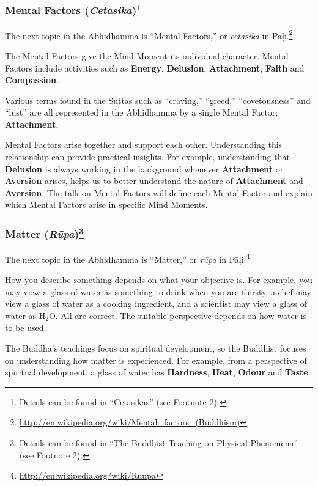 \subsubsection*{Mental Factors (\textit{Cetasika})\footnote{Details can be found in “Cetasikas” (see Footnote 2).}}

The next topic in the Abhidhamma is “Mental Factors,” or \textit{cetasika} in Pāḷi.\footnote{\url{http://en.wikipedia.org/wiki/Mental_factors_(Buddhism)}}

The Mental Factors give the Mind Moment its individual character. Mental Factors include activities such as \textbf{Energy}, \textbf{Delusion}, \textbf{Attachment}, \textbf{Faith} and \textbf{Compassion}. 

Various terms found in the Suttas such as “craving,” “greed,” “covetousness” and “lust” are all represented in the Abhidhamma by a single Mental Factor; \textbf{Attachment}. 

Mental Factors arise together and support each other. Understanding this relationship can provide practical insights. For example, understanding that \textbf{Delusion} is always working in the background whenever \textbf{Attachment} or \textbf{Aversion} arises, helps us to better understand the nature of \textbf{Attachment} and \textbf{Aversion}. The talk on Mental Factors will define each Mental Factor and explain which Mental Factors arise in specific Mind Moments.

\pagebreak

\subsubsection*{Matter (\textit{Rūpa})\footnote{Details can be found in “The Buddhist Teaching on Physical Phenomena” (see Footnote 2).}}

The next topic in the Abhidhamma is “Matter,” or \textit{rūpa} in Pāḷi.\footnote{\url{http://en.wikipedia.org/wiki/Ruupa}}

How you describe something depends on what your objective is. For example, you may view a glass of water as something to drink when you are thirsty, a chef may view a glass of water as a cooking ingredient, and a scientist may view a glass of water as H$_{2}$O. All are correct. The suitable perspective depends on how water is to be used.

The Buddha’s teachings focus on spiritual development, so the Buddhist focuses on understanding how matter is experienced. For example, from a perspective of spiritual development, a glass of water has \textbf{Hardness}, \textbf{Heat}, \textbf{Odour} and \textbf{Taste}.

